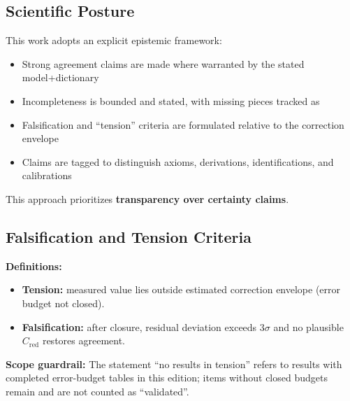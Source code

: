 \subsection*{Scientific Posture}

This work adopts an explicit epistemic framework:
\begin{itemize}
\item Strong agreement claims are made where warranted by the stated model+dictionary
\item Incompleteness is bounded and stated, with missing pieces tracked as \tagOpen{}
\item Falsification and ``tension'' criteria are formulated relative to the correction envelope
\item Claims are tagged to distinguish axioms, derivations, identifications, and calibrations
\end{itemize}

This approach prioritizes \textbf{transparency over certainty claims}.

\subsection*{Falsification and Tension Criteria}

\textbf{Definitions:}
\begin{itemize}
\item \textbf{Tension:} measured value lies outside estimated correction envelope (error budget not closed).
\item \textbf{Falsification:} after closure, residual deviation exceeds $3\sigma$ and no plausible $C_{\mathrm{red}}$ restores agreement.
\end{itemize}

\textbf{Scope guardrail:}
The statement ``no results in tension'' refers to results with completed error-budget tables
in this edition; items without closed budgets remain \tagOpen{} and are not counted as ``validated''.
